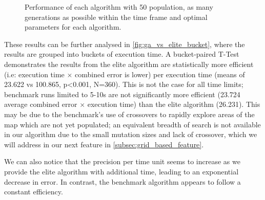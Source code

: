 \documentclass[authoryearcitations]{UoYCSproject}
\begin{document}
\begin{figure}
	\caption[Effects of elitist against tournament selection (box-plot)]{Performance of each algorithm with 50 population, as many generations as possible within the time frame and optimal parameters for each algorithm.}
	\label{fig:ga_vs_elite_box_whiskers}
\end{figure}

These results can be further analysed in \autoref{fig:ga_vs_elite_bucket}, where the results are grouped into buckets of execution time. A bucket-paired T-Test demonstrates the results from the elite algorithm are statistically more efficient (i.e: execution time $\times$ combined error is lower) per execution time (means of 23.622 vs 100.865, p<0.001, N=360). This is not the case for all time limits; benchmark runs limited to 5-10s are not significantly more efficient (23.724 average combined error $\times$ execution time) than the elite algorithm (26.231). This may be due to the benchmark's use of crossovers to rapidly explore areas of the map which are not yet populated; an equivalent breadth of search is not available in our algorithm due to the small mutation sizes and lack of crossover, which we will address in our next feature in \autoref{subsec:grid_based_feature}. 

We can also notice that the precision per time unit seems to increase as we provide the elite algorithm with additional time, leading to an exponential decrease in error. In contrast, the benchmark algorithm appears to follow a constant efficiency. 
\end{document}
